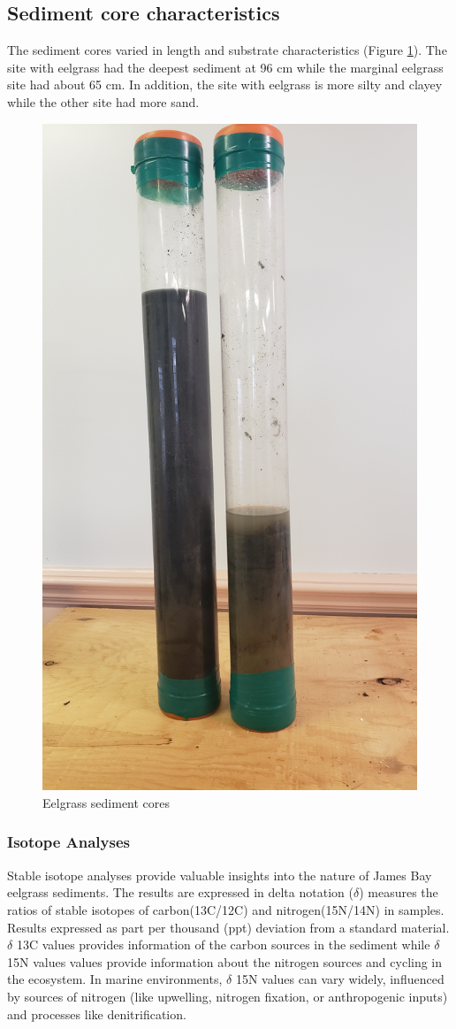 \documentclass[
  12pt,
]{article}
\begin{document}
\hypertarget{sediment-core-characteristics}{%
\subsection{Sediment core
characteristics}\label{sediment-core-characteristics}}

The sediment cores varied in length and substrate characteristics
(Figure \ref{fig:cores}). The site with eelgrass had the deepest
sediment at 96 cm while the marginal eelgrass site had about 65 cm. In
addition, the site with eelgrass is more silty and clayey while the
other site had more sand.

\begin{figure}

{\centering \includegraphics[width=0.5\linewidth,angle=-90]{sedcores} 

}

\caption{Eelgrass sediment cores}\label{fig:cores}
\end{figure}

\hypertarget{isotope-analyses}{%
\subsubsection{Isotope Analyses}\label{isotope-analyses}}

Stable isotope analyses provide valuable insights into the nature of
James Bay eelgrass sediments. The results are expressed in delta
notation (\(\delta\)) measures the ratios of stable isotopes of
carbon(13C/12C) and nitrogen(15N/14N) in samples. Results expressed as
part per thousand (ppt) deviation from a standard material. \(\delta\)
13C values provides information of the carbon sources in the sediment
while \(\delta\) 15N values values provide information about the
nitrogen sources and cycling in the ecosystem. In marine environments,
\(\delta\) 15N values can vary widely, influenced by sources of nitrogen
(like upwelling, nitrogen fixation, or anthropogenic inputs) and
processes like denitrification.
\end{document}
